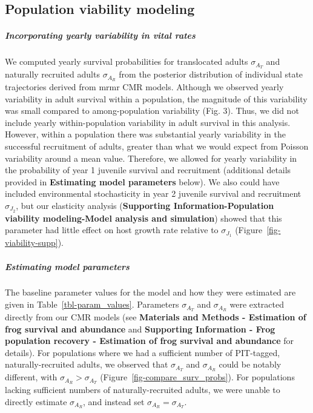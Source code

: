 \documentclass[9pt,twoside,lineno]{pnas-new}
\begin{document}
\hypertarget{population-viability-modeling-1}{%
\subsection{Population viability
modeling}\label{population-viability-modeling-1}}

\hypertarget{incorporating-yearly-variability-in-vital-rates}{%
\subparagraph{Incorporating yearly variability in vital
rates}\label{incorporating-yearly-variability-in-vital-rates}}

We computed yearly survival probabilities for translocated adults
\(\sigma_{A_T}\) and naturally recruited adults \(\sigma_{A_R}\) from
the posterior distribution of individual state trajectories derived from
mrmr CMR models. Although we observed yearly variability in adult
survival within a population, the magnitude of this variability was
small compared to among-population variability
(Fig. 3). Thus, we did not include
yearly within-population variability in adult survival in this analysis.
However, within a population there was substantial yearly variability in
the successful recruitment of adults, greater than what we would expect
from Poisson variability around a mean value. Therefore, we allowed for
yearly variability in the probability of year 1 juvenile survival and
recruitment (additional details provided in \textbf{Estimating model
parameters} below). We also could have included environmental
stochasticity in year 2 juvenile survival and recruitment
\(\sigma_{J_2}\), but our elasticity analysis (\textbf{Supporting
Information-Population viability modeling-Model analysis and
simulation}) showed that this parameter had little effect on host growth
rate relative to \(\sigma_{J_1}\) (Figure~\ref{fig-viability-supp}).

\hypertarget{estimating-model-parameters}{%
\subparagraph{Estimating model
parameters}\label{estimating-model-parameters}}

The baseline parameter values for the model and how they were estimated
are given in Table~\ref{tbl-param_values}. Parameters \(\sigma_{A_T}\)
and \(\sigma_{A_R}\) were extracted directly from our CMR models (see
\textbf{Materials and Methods - Estimation of frog survival and
abundance} and \textbf{Supporting Information - Frog population recovery
- Estimation of frog survival and abundance} for details). For
populations where we had a sufficient number of PIT-tagged,
naturally-recruited adults, we observed that \(\sigma_{A_T}\) and
\(\sigma_{A_R}\) could be notably different, with
\(\sigma_{A_R} > \sigma_{A_T}\) (Figure~\ref{fig-compare_surv_probs}). For populations lacking sufficient numbers of naturally-recruited
adults, we were unable to directly estimate \(\sigma_{A_R}\), and
instead set \(\sigma_{A_R} = \sigma_{A_T}\).
\end{document}
